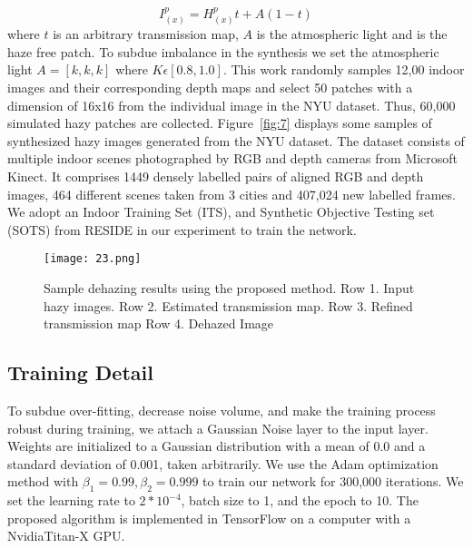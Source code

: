 \documentclass[doctor,english,listoffigures,listoftables]{thesis-uestc}
\begin{document}
\begin{equation}
	I^p_{(x)}=H^p_{(x)}t+A(1-t)
\end{equation}
where $t$ is an arbitrary transmission map, $A$ is the atmospheric light and is the haze free patch. To subdue imbalance in the synthesis we set the atmospheric light $A=[k,k,k]$ where $K\epsilon[0.8,1.0]$.
 This work randomly samples 12,00 indoor images and their corresponding depth maps and select 50 patches with a dimension of 16x16 from the individual image in the NYU dataset. Thus, 60,000 simulated hazy patches are collected. Figure~\ref{fig:7} displays some samples of synthesized hazy images generated from the NYU dataset. The dataset consists of multiple indoor scenes photographed by RGB and depth cameras from Microsoft Kinect. It comprises 1449 densely labelled pairs of aligned RGB and depth images, 464 different scenes taken from 3 cities and 407,024 new labelled frames. We adopt an Indoor Training Set (ITS), and Synthetic Objective Testing set (SOTS) from RESIDE in our experiment to train the network. 
\begin{figure}[H]
\texttt{[image: 23.png]}
\caption{Sample dehazing results using the proposed method. Row 1. Input hazy images. Row 2. Estimated transmission map. Row 3. Refined transmission map Row 4. Dehazed Image}
\label{fig:8}
\end{figure}
\subsection{Training Detail}
To subdue over-fitting, decrease noise volume, and make the training process robust during training, we attach a Gaussian Noise layer to the input layer. Weights are initialized to a Gaussian distribution with a mean of 0.0 and a standard deviation of 0.001, taken arbitrarily. We use the Adam optimization method with $\beta_1=0.99, \beta_2=0.999$ to train our network for 300,000 iterations. We set the learning rate to $2*10^{-4}$, batch size to 1, and the epoch to 10. The proposed algorithm is implemented in TensorFlow on a computer with a NvidiaTitan-X GPU.
\end{document}
